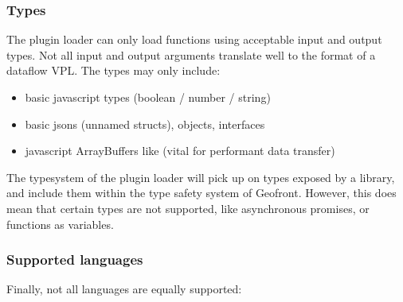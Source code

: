 \subsubsection*{Types}
The plugin loader can only load functions using acceptable input and output types. 
Not all input and output arguments translate well to the format of a dataflow VPL. 
The types may only include: 
\begin{itemize}
  \item basic javascript types (boolean / number / string)
  \item basic jsons (unnamed structs), objects, interfaces 
  \item javascript ArrayBuffers like  (vital for performant data transfer)
\end{itemize}
The typesystem of the plugin loader will pick up on types exposed by a library, and include them within the type safety system of Geofront. 
However, this does mean that certain types are not supported, like asynchronous promises, or functions as variables. 




\subsubsection*{Supported languages}
Finally, not all languages are equally supported:

